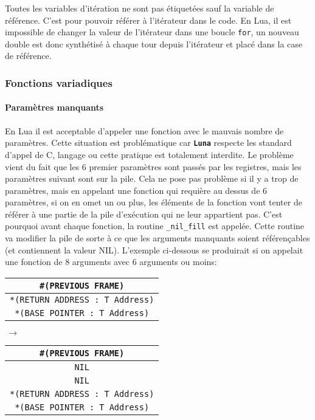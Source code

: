 \documentclass{article}
\newcommand{\luna}{\textbf{\texttt{Luna}}}
\begin{document}
Toutes les variables d'itération ne sont pas étiquetées sauf la variable de référence. C'est pour pouvoir référer à l'itérateur dans le code. En Lua, il est impossible de changer la valeur de l'itérateur dans une boucle {\lstset{style=lua}\lstinline$for$}, un nouveau double est donc synthétisé à chaque tour depuis l'itérateur et placé dans la case de référence.

\subsubsection{Fonctions variadiques}
\paragraph{Paramètres manquants}
En Lua il est acceptable d'appeler une fonction avec le mauvais nombre de paramètres. Cette situation est problématique car \luna{} respecte les standard d'appel de C, langage ou cette pratique est totalement interdite. Le problème vient du fait que les 6 premier paramètres sont passés par les registres, mais les paramètres suivant sont sur la pile. Cela ne pose pas problème si il y a trop de paramètres, mais en appelant une fonction qui requière au dessus de 6 paramètres, si on en omet un ou plus, les éléments de la fonction vont tenter de référer à une partie de la pile d'exécution qui ne leur appartient pas. C'est pourquoi avant chaque fonction, la routine \texttt{\_{}nil\_{}fill} est appelée. Cette routine va modifier la pile de sorte à ce que les arguments manquants soient référençables (et contiennent la valeur NIL). L'exemple ci-dessous se produirait si on appelait une fonction de 8 arguments avec 6 arguments ou moins:

\begin{center}
  \begin{tabular}{|c|}
    \hline
    \texttt{\#{}(PREVIOUS FRAME)}\\
    \hline
    \texttt{*(RETURN ADDRESS : T Address)}\\
    \hline
    \texttt{*(BASE POINTER : T Address)}\\
    \hline
  \end{tabular}
  \hspace{1cm} {\Huge{$\,\to\,$}} \hspace{1cm}
  \begin{tabular}{|c|}
    \hline
    \texttt{\#{}(PREVIOUS FRAME)}\\
    \hline
    \texttt{NIL}\\
    \hline
    \texttt{NIL}\\
    \hline
    \texttt{*(RETURN ADDRESS : T Address)}\\
    \hline
    \texttt{*(BASE POINTER : T Address)}\\
    \hline
  \end{tabular}
\end{center}
\end{document}
